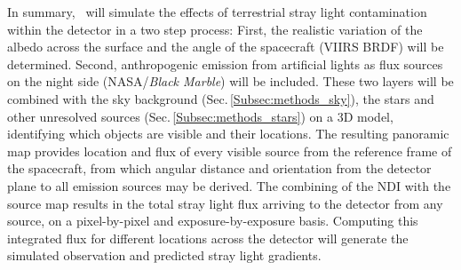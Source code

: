 \documentclass[usenames,dvipsnames,modern]{CLASS_FILES/aastex631}  %
\begin{document}


In summary, \MyName\ will simulate the effects of terrestrial stray light contamination within the detector in a two step process: First, the realistic variation of the albedo across the surface and the angle of the spacecraft (VIIRS BRDF) will be determined. Second, anthropogenic emission from artificial lights as flux sources on the night side (NASA/\emph{Black Marble}) will be included. These two layers will be combined with the sky background (Sec.\,\ref{Subsec:methods_sky}), the stars and other unresolved sources (Sec.\,\ref{Subsec:methods_stars}) on a 3D model, identifying which objects are visible and their locations. The resulting panoramic map provides location and flux of every visible source from the reference frame of the spacecraft, from which angular distance and orientation from the detector plane to all emission sources may be derived. The combining of the NDI with the source map results in the total stray light flux arriving to the detector from any source, on a pixel-by-pixel and exposure-by-exposure basis. Computing this integrated flux for different locations across the detector will generate the simulated observation and predicted stray light gradients.



\end{document}
